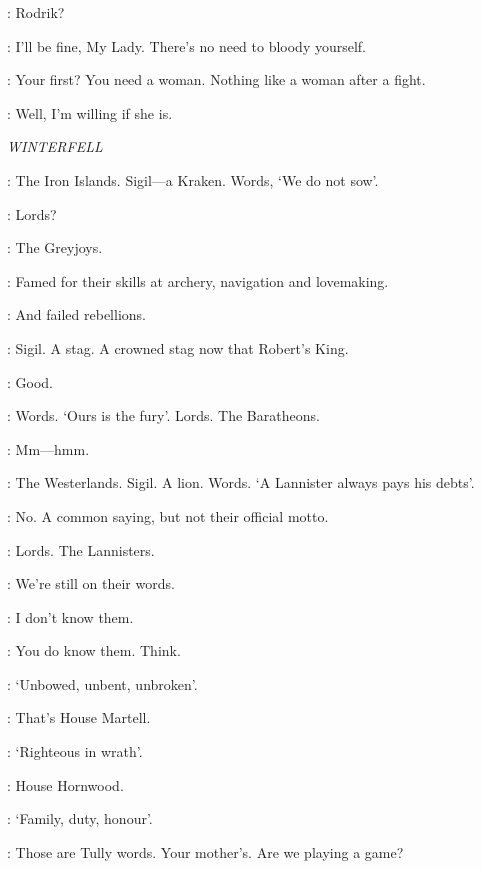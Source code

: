 \CATELYN: Rodrik? 

\RODRIK: I'll be fine, My Lady. There's no need to bloody yourself. 


\BRONN: Your first? You need a woman. Nothing like a woman after a fight. 

\TYRION:  Well, I'm willing if she is. 


\scene

\textit{WINTERFELL} 


\BRAN: The Iron Islands. Sigil---a Kraken. Words, `We do not sow'. 

\LUWIN: Lords? 

\BRAN: The Greyjoys. 

\THEON: Famed for their skills at archery, navigation and lovemaking. 

\LUWIN: And failed rebellions. 


\BRAN: Sigil. A stag. A crowned stag now that Robert's King. 

\LUWIN: Good. 

\BRAN: Words. `Ours is the fury'. Lords. The Baratheons. 

\LUWIN: Mm---hmm. 

\BRAN: The Westerlands. Sigil. A lion. Words. `A Lannister always pays his debts'. 

\LUWIN: No. A common saying, but not their official motto. 

\BRAN: Lords. The Lannisters. 

\LUWIN: We're still on their words. 

\BRAN: I don't know them. 

\LUWIN: You do know them. Think. 

\BRAN: `Unbowed, unbent, unbroken'. 

\LUWIN: That's House Martell. 

\BRAN: `Righteous in wrath'.

\LUWIN: House Hornwood. 

\BRAN: `Family, duty, honour'. 

\LUWIN: Those are Tully words. Your mother's. Are we playing a game? 

